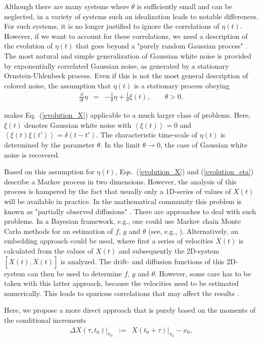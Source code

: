 \documentclass[aps,twocolumn,superscriptaddress,showpacs,showkeys]{revtex4}
\newcommand{\p}{\partial}
\newcommand{\fracpp}[1]{\frac{\p}{\p#1}}
\begin{document}
Although there are many systems where $\theta$ is sufficiently small and can be neglected, in a variety of systems such an
idealization leads to notable differences.
For such systems, it is no longer justified to ignore the correlations of $\eta(t)$.
However, if we want to account for these correlations, we need a description of the evolution of $\eta(t)$ that goes beyond
a "purely random Gaussian process" \cite{risken89}.
The most natural and simple generalization of Gaussian white noise is provided by exponentially correlated Gaussian
noise, as generated by a stationary Ornstein-Uhlenbeck process.
Even if this is not the most general description of colored noise, the assumption that $\eta(t)$ is a stationary process
obeying
%
\begin{eqnarray}\label{evolution_eta}
\fracpp{t} \eta &=& -\frac{1}{\theta} \eta+\frac{1}{\theta}\xi(t),\qquad \theta>0,
\end{eqnarray}

\noindent makes Eq.~(\ref{evolution_X}) applicable to a much larger class of problems.
Here, $\xi(t)$ denotes Gaussian white noise with $\left<\xi(t)\right>\!=\!0$ and
$\left<\xi(t)\xi(t')\right>\!=\!\delta(t\!-\!t')$.
The characteristic time-scale of $\eta(t)$ is determined by the parameter $\theta$.
In the limit $\theta\to 0$, the case of Gaussian white noise is recovered.

Based on this assumption for $\eta(t)$, Eqs.~(\ref{evolution_X}) and (\ref{evolution_eta}) describe a Markov process in
two dimensions. However, the analysis of this process is hampered by the fact that usually only a 1D-series of values
of $X(t)$ will be available in practice.
In the mathematical community this problem is known as "partially observed diffusions" \cite{dembo86,campillo89}.
There are approaches to deal with such problems. In a Bayesian framework, e.g., one could use Markov chain
Monte Carlo methods for an estimation of $f$, $g$ and $\theta$ (see, e.g., \cite{golightly08}).
Alternatively, an embedding approach could be used, where first a series of velocities $\dot X(t)$ is calculated from the
values of $X(t)$ and subsequently the 2D-system $[X(t),\dot X(t)]$ is analyzed.
The drift- and diffusion functions of this 2D-system can then be used to determine $f$, $g$ and $\theta$. However, some care
has to be taken with this latter approach, because the velocities need to be estimated numerically. This leads to spurious
correlations that may affect the results \cite{lehle15}.

Here, we propose a more direct approach that is purely based on the moments of the conditional increments
%
\begin{eqnarray}
\Delta X(\tau,t_0)\big|_{x_0} &:=& X(t_0+\tau)\big|_{x_0}\!-x_0,
\end{eqnarray}
\end{document}
